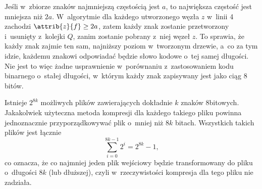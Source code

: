 \noindent Jeśli w~zbiorze znaków najmniejszą częstością jest $a$, to największa częstość jest mniejsza niż $2a$.
W~algorytmie  dla każdego utworzonego węzła $z$ w~linii 4 zachodzi $\attrib{z}{f}\ge2a$, zatem każdy znak zostanie przetworzony i~usunięty z~kolejki $Q$, zanim zostanie pobrany z~niej węzeł $z$.
To sprawia, że każdy znak zajmie ten sam, najniższy poziom w~tworzonym drzewie, a~co za tym idzie, każdemu znakowi odpowiadać będzie słowo kodowe o~tej samej długości.
Nie jest to więc żadne usprawnienie w~porównaniu z~zastosowaniem kodu binarnego o~stałej długości, w~którym każdy znak zapisywany jest jako ciąg 8 bitów.

\exercise %
Istnieje $2^{8k}$ możliwych plików zawierających dokładnie $k$ znaków 8\nbhyphen bitowych.
Jakakolwiek użyteczna metoda kompresji dla każdego takiego pliku powinna jednoznacznie przyporządkowywać plik o~mniej niż $8k$ bitach.
Wszystkich takich plików jest łącznie
\[
	\sum_{i=0}^{8k-1}2^i = 2^{8k}-1,
\]
co oznacza, że co najmniej jeden plik wejściowy będzie transformowany do pliku o~długości $8k$ (lub dłuższej), czyli w~rzeczywistości kompresja dla tego pliku nie zadziała.
